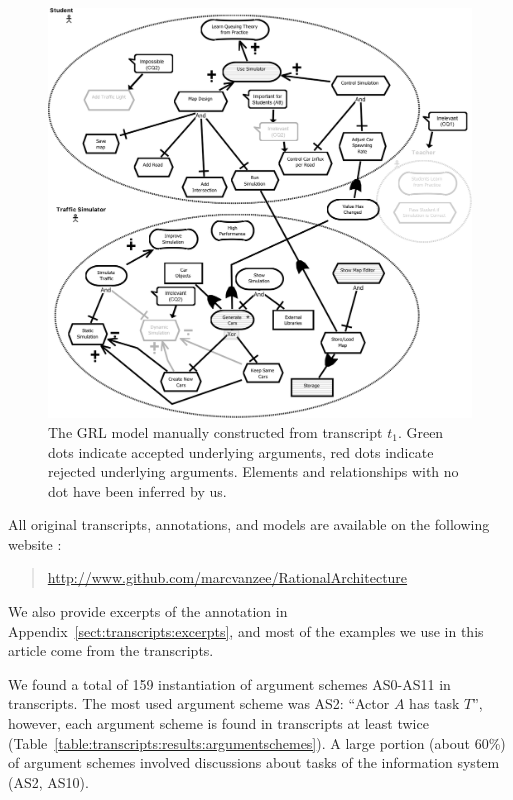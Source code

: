 \begin{figure}[h!]
\includegraphics[width=\textwidth]{img/Fig6}
\caption{The GRL model manually constructed from transcript $t_1$. Green dots indicate accepted underlying arguments, red dots indicate rejected underlying arguments. Elements and relationships with no dot have been inferred by us.} %
\label{fig:transcripts:grl}
\end{figure} 

All original transcripts, annotations, and models are available on the following website :
\begin{quote} \url{http://www.github.com/marcvanzee/RationalArchitecture}
\end{quote}
We also provide excerpts of the annotation in Appendix~\ref{sect:transcripts:excerpts}, and most of the examples we use in this article come from the transcripts.

We found a total of 159 instantiation of argument schemes AS0-AS11 in transcripts. The most used argument scheme was AS2: ``Actor $A$ has task $T$'', however, each argument scheme is found in transcripts at least twice (Table~\ref{table:transcripts:results:argumentschemes}). A large portion (about 60\%) of argument schemes involved discussions about tasks of the information system (AS2, AS10).

